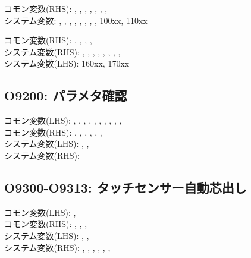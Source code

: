\begin{hosoku}\small
コモン変数(RHS): , , , , , , , \\
システム変数: , , , , , , , , \ttNum100xx, \ttNum110xx
\end{hosoku}

\begin{hosoku}\small
コモン変数(RHS): , , , , \\
システム変数(RHS): , , , , , , , , \\
システム変数(LHS): \ttNum160xx, \ttNum170xx
\end{hosoku}

\subsection{O9200: パラメタ確認}
\begin{hosoku}\small
コモン変数(LHS): , , , , , , , , , , \\
コモン変数(RHS): , , , , , , \\
システム変数(LHS): , , \\
システム変数(RHS): 
\end{hosoku}

\subsection{O9300-O9313: タッチセンサー自動芯出し}
\begin{hosoku}\small
コモン変数(LHS): , \\
コモン変数(RHS): , , , \\
システム変数(LHS): , , \\
システム変数(RHS): , , , , , , 
\end{hosoku}

